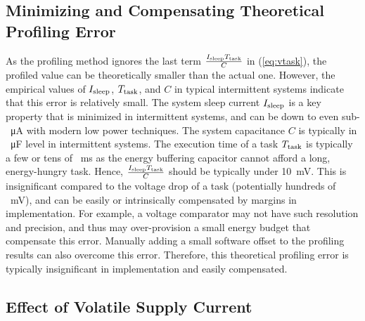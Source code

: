 

\subsection{Minimizing and Compensating Theoretical Profiling Error}

As the profiling method ignores the last term $\frac{I_{\text{sleep}}T_{\text{task}}}{C}$ in (\ref{eq:vtask}), the profiled value can be theoretically smaller than the actual one.
However, the empirical values of $I_{\text{sleep}}$, $T_{\text{task}}$, and $C$ in typical intermittent systems indicate that this error is relatively small. 
The system sleep current $I_{\text{sleep}}$ is a key property that is minimized in intermittent systems, and can be down to even sub-\SI{}{\micro\ampere} with modern low power techniques. 
The system capacitance $C$ is typically in \SI{}{\micro\farad} level in intermittent systems. 
The execution time of a task $T_{\text{task}}$ is typically a few or tens of \SI{}{\milli\second} as the energy buffering capacitor cannot afford a long, energy-hungry task. 
Hence, $\frac{I_{\text{sleep}}T_{\text{task}}}{C}$ should be typically under \SI{10}{\milli\volt}. 
This is insignificant compared to the voltage drop of a task (potentially hundreds of \SI{}{\milli\volt}), and can be easily or intrinsically compensated by margins in implementation.
For example, a voltage comparator may not have such resolution and precision, and thus may over-provision a small energy budget that compensate this error. 
Manually adding a small software offset to the profiling results can also overcome this error. 
Therefore, this theoretical profiling error is typically insignificant in implementation and easily compensated. 

    
\subsection{Effect of Volatile Supply Current}

